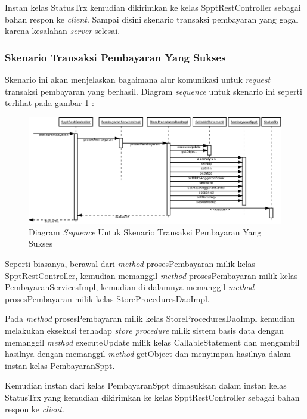 \documentclass[pdftex,12pt, oneside]{article}
\begin{document}
Instan kelas StatusTrx kemudian dikirimkan ke kelas SpptRestController sebagai bahan respon ke \textit{client}. Sampai disini skenario transaksi pembayaran yang gagal karena kesalahan \textit{server} selesai.

\subsubsection{Skenario Transaksi Pembayaran Yang Sukses}

Skenario ini akan menjelaskan bagaimana alur komunikasi untuk \textit{request} transaksi pembayaran yang berhasil. Diagram \textit{sequence} untuk skenario ini seperti terlihat pada gambar \ref{fig:uml-seq-trx} :

\begin{figure}[H]
  \centering
  \includegraphics[width=1\textwidth]{./resources/diagram/uml-seq-trx}
  \caption{Diagram \textit{Sequence} Untuk Skenario Transaksi Pembayaran Yang Sukses}
  \label{fig:uml-seq-trx}
\end{figure}

Seperti biasanya, berawal dari \textit{method} prosesPembayaran milik kelas SpptRestController, kemudian memanggil \textit{method} prosesPembayaran milik kelas PembayaranServicesImpl, kemudian di dalamnya memanggil \textit{method} prosesPembayaran milik kelas StoreProceduresDaoImpl.

Pada \textit{method} prosesPembayaran milik kelas StoreProceduresDaoImpl kemudian melakukan eksekusi terhadap \textit{store procedure} milik sistem basis data dengan memanggil \textit{method} executeUpdate milik kelas CallableStatement dan mengambil hasilnya dengan memanggil \textit{method} getObject dan menyimpan hasilnya dalam instan kelas PembayaranSppt.

Kemudian instan dari kelas PembayaranSppt dimasukkan dalam instan kelas StatusTrx yang kemudian dikirimkan ke kelas SpptRestController sebagai bahan respon ke \textit{client}.
\end{document}
